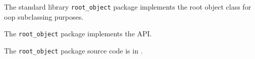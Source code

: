 
The standard library {\tt root\_object} package implements the root object class for oop subclassing purposes.

The {\tt root\_object} package implements the  API.

The {\tt root\_object} package source code is in .




